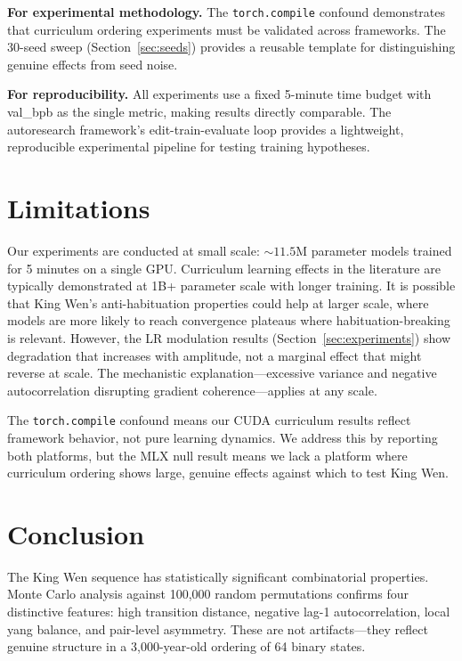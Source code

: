 \documentclass{article}
\begin{document}
\textbf{For experimental methodology.} The \texttt{torch.compile} confound demonstrates that curriculum ordering experiments must be validated across frameworks. The 30-seed sweep (Section~\ref{sec:seeds}) provides a reusable template for distinguishing genuine effects from seed noise.

\textbf{For reproducibility.} All experiments use a fixed 5-minute time budget with val\_bpb as the single metric, making results directly comparable. The autoresearch framework's edit-train-evaluate loop provides a lightweight, reproducible experimental pipeline for testing training hypotheses.

\section{Limitations}\label{sec:limitations}

Our experiments are conducted at small scale: ${\sim}11.5$M parameter models trained for 5 minutes on a single GPU. Curriculum learning effects in the literature are typically demonstrated at 1B+ parameter scale with longer training. It is possible that King Wen's anti-habituation properties could help at larger scale, where models are more likely to reach convergence plateaus where habituation-breaking is relevant. However, the LR modulation results (Section~\ref{sec:experiments}) show degradation that increases with amplitude, not a marginal effect that might reverse at scale. The mechanistic explanation---excessive variance and negative autocorrelation disrupting gradient coherence---applies at any scale.

The \texttt{torch.compile} confound means our CUDA curriculum results reflect framework behavior, not pure learning dynamics. We address this by reporting both platforms, but the MLX null result means we lack a platform where curriculum ordering shows large, genuine effects against which to test King Wen.

\section{Conclusion}\label{sec:conclusion}

The King Wen sequence has statistically significant combinatorial properties. Monte Carlo analysis against 100,000 random permutations confirms four distinctive features: high transition distance, negative lag-1 autocorrelation, local yang balance, and pair-level asymmetry. These are not artifacts---they reflect genuine structure in a 3,000-year-old ordering of 64 binary states.
\end{document}
